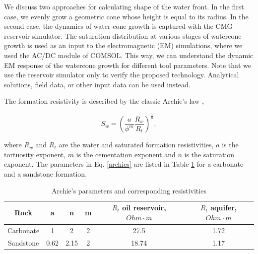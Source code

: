 \documentclass{eage19}
\begin{document}
We discuss two approaches for calculating shape of the water front. In the first case, we evenly grow a geometric cone whose height is equal to its radius. In the  second case, the dynamics of water-cone growth is captured with the CMG reservoir simulator. The saturation distribution at various stages of watercone growth is used as an input to the electromagnetic (EM) simulations, where we used the AC/DC module of COMSOL. This way, we can understand the dynamic EM response of the watercone growth for different tool parameters. Note that we use the reservoir simulator only to verify the proposed technology. Analytical solutions, field data, or other input data can be used instead.

The formation resistivity is described by the classic Archie's law \citep{ARCHIE1942},

\begin{equation}
S_{w} = \left( \frac{a}{\phi^m}\frac{R_w}{R_t}\right)^{\frac{1}{n}},
\label{archies}
\end{equation}

where $R_w$ and $R_t$ are the water and saturated formation resistivities, $a$ is the tortuosity exponent, $m$ is the cementation exponent and $n$ is the saturation exponent. The parameters in Eq. \ref{archies} are listed in Table \ref{geoelectric_table} for a carbonate and a sandstone formation.

\begin{table}[h!]
\begin{center}
\begin{tabular}{|c|c|c|c|c|c|}
\hline
\textbf{Rock} & \textbf{a} & \textbf{n}& \textbf{m} & \textbf{$R_t$ oil reservoir, $Ohm \cdot m$}& \textbf{$R_t$ aquifer, $Ohm \cdot m$}  \\
\hline
Carbonate    & 1 & 2 & 2 & 27.5 & 1.72  \\
Sandstone    & 0.62 & 2.15 & 2 & 18.74 & 1.17   \\
\hline
\end{tabular}
\caption{Archie's parameters and corresponding resistivities}
\label{geoelectric_table}
\end{center}
\end{table}
\end{document}
